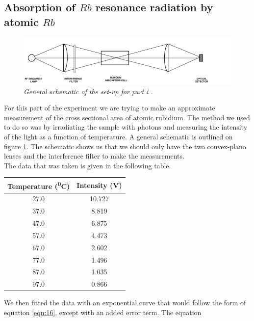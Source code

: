 \documentclass[twocolumn]{article}
\begin{document}
\subsection{Absorption of $Rb$ resonance radiation by atomic $Rb$}
\begin{figure}
\begin{minipage}[t]{\textwidth}
\includegraphics[width=\linewidth]{pictures/i-schem.png}
\caption{\textit{General schematic of the set-up for part i \cite{ref:3}.}}
\label{fig:16}
\end{minipage}
\end{figure}
For this part of the experiment we are trying to make an approximate 
measurement of the cross sectional area of atomic rubidium. The method we used 
to do so was by irradiating the sample with photons and measuring the 
intensity of the light as a function of temperature. A general schematic is 
outlined on figure \ref{fig:16}. The schematic shows us that we should only 
have the two convex-plano lenses and the interference filter to make the 
measurements.
\\
The data that was taken is given in the following table.
\begin{minipage}{\linewidth}
\center
\begin{tabular}{|c|c|}
\hline
Temperature (\textsuperscript{0}C) & Intensity (V) \\ \hline
27.0 & 10.727 \\ \hline
37.0 & 8.819 \\ \hline
47.0 & 6.875 \\ \hline
57.0 & 4.473 \\ \hline
67.0 & 2.602 \\ \hline
77.0 & 1.496 \\ \hline
87.0 & 1.035 \\ \hline
97.0 & 0.866 \\ \hline
\end{tabular}
\label{tbl:4}
\end{minipage}
We then fitted the data with an exponential curve that would follow the 
form of equation \ref{eqn:16}, except with an added error term. The equation 
\end{document}
